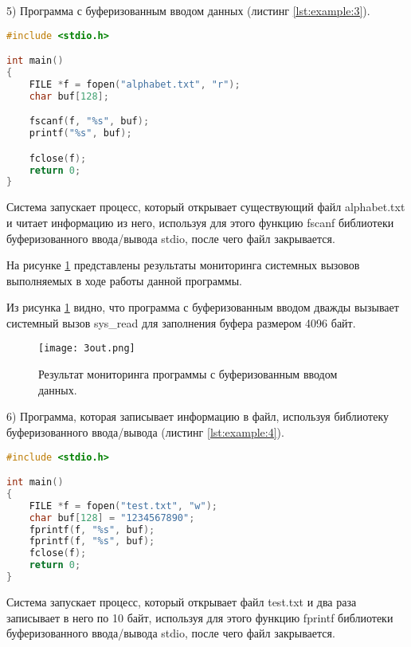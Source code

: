     5) Программа с буферизованным вводом данных (листинг \ref{lst:example:3}).
        \begin{lstlisting}[language=C, label=lst:example:3, caption=Программа с буфферизованным вводом данных из файла]
#include <stdio.h>

int main()
{
    FILE *f = fopen("alphabet.txt", "r");
    char buf[128];

    fscanf(f, "%s", buf);
    printf("%s", buf);

    fclose(f);
    return 0;
}
        \end{lstlisting}

        Система запускает процесс, который открывает существующий файл alphabet.txt и
        читает информацию из него, используя для этого функцию fscanf
        библиотеки буферизованного ввода/вывода stdio, 
        после чего файл закрывается.

        На рисунке \ref{examples:3out} 
        представлены результаты мониторинга системных вызовов
        выполняемых в ходе работы данной программы.
        
        Из рисунка \ref{examples:3out} видно, что программа с буферизованным вводом дважды
        вызывает системный вызов sys\_read для заполнения буфера размером 4096 байт.

        \begin{figure}[h!]
            \centering
            \texttt{[image: 3out.png]}
            \caption{Результат мониторинга программы с буферизованным вводом данных.}
            \label{examples:3out}
        \end{figure}

    6) Программа, которая записывает информацию в файл, используя библиотеку буферизованного ввода/вывода (листинг \ref{lst:example:4}).
        \begin{lstlisting}[language=C, label=lst:example:4, caption=Программа с буферизованным выводом данных в файл]
#include <stdio.h>

int main()
{
    FILE *f = fopen("test.txt", "w");
    char buf[128] = "1234567890";
    fprintf(f, "%s", buf);
    fprintf(f, "%s", buf);
    fclose(f);
    return 0;
}
        \end{lstlisting}

        Система запускает процесс, который открывает файл test.txt и
        два раза записывает в него по 10 байт, используя для этого функцию fprintf
        библиотеки буферизованного ввода/вывода stdio, 
        после чего файл закрывается.

